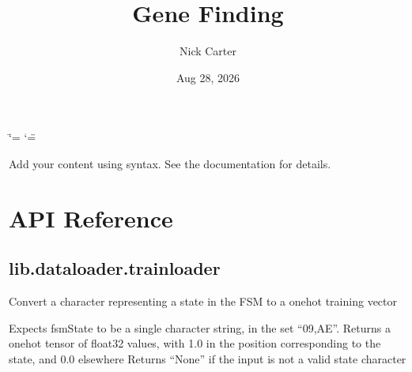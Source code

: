 \documentclass[letterpaper,10pt,english]{sphinxmanual}
\title{Gene Finding}
\date{Aug 28, 2026}
\author{Nick Carter}
\begin{document}
\ifdefined\shorthandoff
  \ifnum\catcode`\=\string=\active\shorthandoff{=}\fi
  \ifnum\catcode`\"=\active{}\fi
\fi

\pagestyle{empty}
\sphinxmaketitle
\pagestyle{plain}
\sphinxtableofcontents
\pagestyle{normal}
\label{\detokenize{index::doc}}


\sphinxAtStartPar
Add your content using  syntax. See the
documentation for details.

\sphinxstepscope


\chapter{API Reference}
\label{\detokenize{api:api-reference}}\label{\detokenize{api::doc}}

\section{lib.dataloader.trainloader}
\label{\detokenize{api:module-lib.dataloader.trainloader}}\label{\detokenize{api:lib-dataloader-trainloader}}

\begin{fulllineitems}
\label{\detokenize{api:lib.dataloader.trainloader.fsmStateToOneHot}}
\pysigstartsignatures
\pysiglinewithargsret
{}
{}
{}
\pysigstopsignatures
\sphinxAtStartPar
Convert a character representing a state in the FSM to a one\sphinxhyphen{}hot training vector

\sphinxAtStartPar
Expects fsmState to be a single character string, in the set “0\sphinxhyphen{}9,A\sphinxhyphen{}E”.
Returns a one\sphinxhyphen{}hot tensor of float32 values, with 1.0 in the position corresponding to the state, and 0.0 elsewhere
Returns “None” if the input is not a valid state character

\end{fulllineitems}
\end{document}

